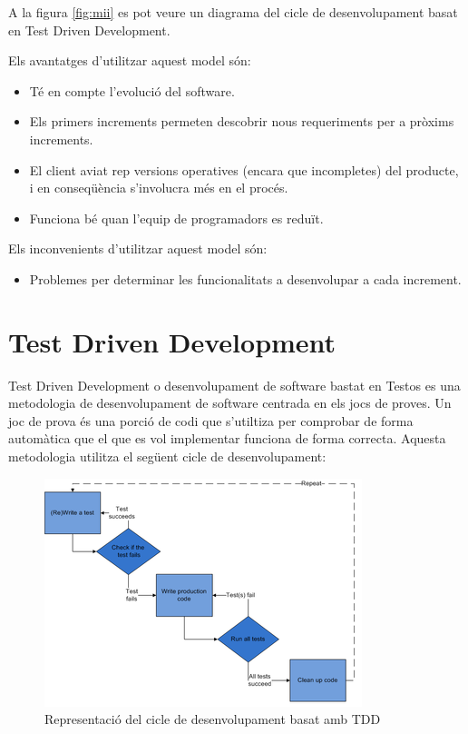 A la figura \ref{fig:mii} es pot veure un diagrama del cicle de desenvolupament basat en Test Driven Development.

Els avantatges d’utilitzar aquest model són:

\begin{itemize}
\item{Té en compte l’evolució del software.}
\item{Els primers increments permeten descobrir nous requeriments per a pròxims increments.}
\item{El client aviat rep versions operatives (encara que incompletes) del producte, i en conseqüència s’involucra més en el procés.}
\item{Funciona bé quan l’equip de programadors es reduït.}
\end{itemize}

Els inconvenients d’utilitzar aquest model són:

\begin{itemize}
\item{Problemes per determinar les funcionalitats a desenvolupar a cada increment.}
\end{itemize}

\section{Test Driven Development}
\label{sec:tdd}

Test Driven Development o desenvolupament de software bastat en Testos es una metodologia de desenvolupament de software centrada en els jocs de proves. Un joc de prova és una porció de codi que s'utiltiza per comprobar de forma automàtica que el que es vol implementar funciona de forma correcta. Aquesta metodologia utilitza el següent cicle de desenvolupament: 

\begin{figure}[htbp]
\centering\includegraphics{img/test-driven-development.png}
\caption{Representació del cicle de desenvolupament basat amb TDD}
\label{fig:tdd}
\end{figure} 


